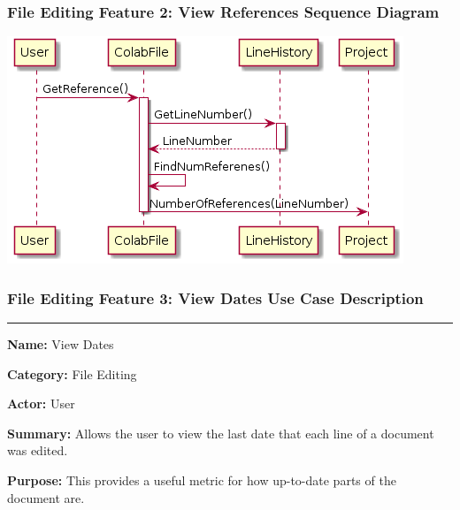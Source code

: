 \documentclass[twoside,letterpaper]{article}
\begin{document}
\subsubsection[File Editing Feature 2: View References Sequence Diagram]{\rmfamily\bfseries\color{black}
	File Editing Feature 2: View References Sequence Diagram}
\hypertarget{RefHeading22059017292}{}

\bigskip

\includegraphics[width=\textwidth]{images/SequenceDiagrams/References}

\newpage

\subsubsection[File Editing Feature 3: View Dates]{\rmfamily\bfseries\color{black}
	File Editing Feature 3: View Dates Use Case Description}
\hypertarget{RefHeading22059017292}{}

\vspace{2pt}
\hrule
\vspace{8pt}
	\noindent\textbf{Name:} View Dates \newline
	
	\noindent\textbf{Category:} File Editing \newline

	\noindent\textbf{Actor:} User \newline
	
	\noindent\textbf{Summary:} Allows the user to view the last date that each line of a document was edited. \newline
	
	\noindent\textbf{Purpose:} This provides a useful metric for how up-to-date parts of the document are. \newline
	
\end{document}
